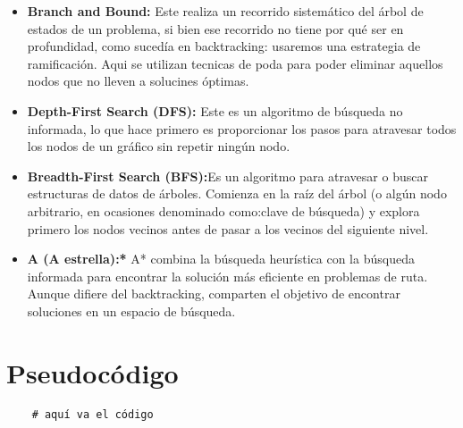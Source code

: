 \documentclass[a4paper,12pt]{article}
\begin{document}
\begin{itemize}
    \item \textbf{Branch and Bound:} Este realiza un recorrido sistemático del árbol de estados de un problema, si bien ese recorrido no tiene por qué ser en profundidad, como sucedía en backtracking: usaremos una estrategia de ramificación. Aqui se utilizan tecnicas de poda para poder eliminar aquellos nodos que no lleven a solucines óptimas.
    
    \item \textbf{Depth-First Search (DFS):} Este es un algoritmo de búsqueda no informada, lo que hace primero es proporcionar los pasos para atravesar todos los nodos de un gráfico sin repetir ningún nodo.
    
    \item \textbf{Breadth-First Search (BFS):}Es un algoritmo para atravesar o buscar estructuras de datos de árboles. Comienza en la raíz del árbol (o algún nodo arbitrario, en ocasiones denominado como:clave de búsqueda) y explora primero los nodos vecinos antes de pasar a los vecinos del siguiente nivel.
    
    \item \textbf{A (A estrella):*} A* combina la búsqueda heurística con la búsqueda informada para encontrar la solución más eficiente en problemas de ruta. Aunque difiere del backtracking, comparten el objetivo de encontrar soluciones en un espacio de búsqueda.
\end{itemize}





\section{Pseudocódigo}

\begin{verbatim}
    # aquí va el código 
\end{verbatim}
\end{document}
